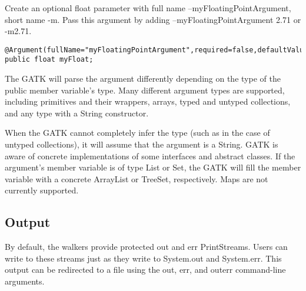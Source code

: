 \documentclass[11pt,fullpage]{article}
\begin{document}
Create an optional float parameter with full name
--myFloatingPointArgument, short name -m.  Pass this argument by
adding --myFloatingPointArgument 2.71 or -m2.71.
\begin{verbatim}
@Argument(fullName="myFloatingPointArgument",required=false,defaultValue="3.14159")
public float myFloat;
\end{verbatim}

The GATK will parse the argument differently depending on the type of
the public member variable's type.  Many different argument types are 
supported, including primitives and their wrappers, arrays, typed and 
untyped collections, and any type with a String constructor.

When the GATK cannot completely infer the type (such as in the case of
untyped collections), it will assume that the argument is a String.
GATK is aware of concrete implementations of some interfaces and
abstract classes.  If the argument's member variable is of type List
or Set, the GATK will fill the member variable with a concrete
ArrayList or TreeSet, respectively.  Maps are not currently supported.

\subsection{Output}
By default, the walkers provide protected out and err PrintStreams.
Users can write to these streams just as they write to System.out and
System.err.  This output can be redirected to a file using the out,
err, and outerr command-line arguments.
\end{document}
